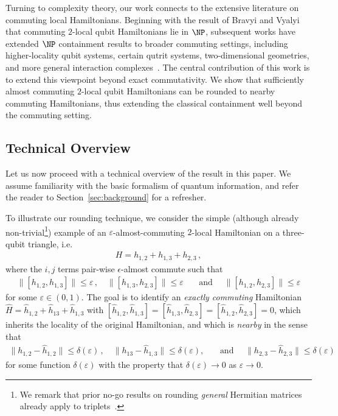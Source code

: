 \documentclass[11pt]{article}
\theoremstyle{plain}
\newcommand{\eps}{\varepsilon}
\begin{document}
Turning to complexity theory, our work connects to the extensive literature
on commuting local Hamiltonians.  Beginning with the result of Bravyi and
Vyalyi~\cite{bravyi2004commutativeversionklocalhamiltonian} that commuting
$2$-local qubit Hamiltonians lie in $\NP$, subsequent works have extended
$\NP$ containment results to broader commuting settings, including
higher-locality qubit systems, certain qutrit systems, two-dimensional
geometries, and more general interaction complexes~\cite{aharonov2011complexity,schuch2011complexitycommutinghamiltonianssquare,AKV,irani2023commutinglocalhamiltonianproblem,bostanci2025commutinglocalhamiltonians2d}.
The central contribution of this work is to extend this viewpoint beyond
exact commutativity.  We show that sufficiently almost commuting $2$-local
qubit Hamiltonians can be rounded to nearby commuting Hamiltonians, thus
extending the classical containment well beyond the commuting setting.


\subsection{Technical Overview}
Let us now proceed with a technical overview of the result in this paper. We assume familiarity with the basic formalism of quantum information, and refer the reader to Section~\ref{sec:background} for a refresher.

To illustrate our rounding technique, we consider the simple (although already non-trivial\footnote{We remark that prior no-go results on rounding \emph{general} Hermitian matrices already apply to triplets~\cite{Davidson1985}.}) example of an $\eps$-almost-commuting $2$-local Hamiltonian on a three-qubit triangle, i.e.
\begin{align}
H = h_{1,2} + h_{1,3} + h_{2,3} \, , 
\end{align}
where the $i,j$ terms pair-wise $\epsilon$-almost commute such that 
\begin{align}
\| [h_{1,2},h_{1,3}]\| \leq \eps \, , \quad \| [h_{1,3},h_{2,3}]\| \leq \eps \quad\,\,\, \text{ and } \quad \| [h_{1,2},h_{2,3}]\| \leq \eps
\end{align}
for some $\eps \in (0,1)$. The goal is to identify an \emph{exactly commuting} Hamiltonian $\hat{H} = \hat h_{1,2} + \hat h_{13} + \hat h_{1,3}$ with $[\hat h_{1,2},\hat h_{1,3}] = [\hat h_{1,3},\hat h_{2,3}] = [\hat h_{1,2},\hat h_{2,3}] = 0$, which inherits the locality of the original Hamiltonian, and which is \emph{nearby} in the sense that
\begin{align}
\| h_{1,2} - \hat h_{1,2}\| \leq \delta(\eps) \, , \quad\| h_{13} - \hat h_{1,3}\| \leq \delta(\eps), \quad\,\,\, \text{ and } \quad \| h_{2,3} - \hat h_{2,3}\| \leq \delta(\eps)
\end{align}
for some function $\delta(\eps)$ with the property that $\delta(\eps) \rightarrow 0$ as $\eps \rightarrow 0$.
\end{document}
